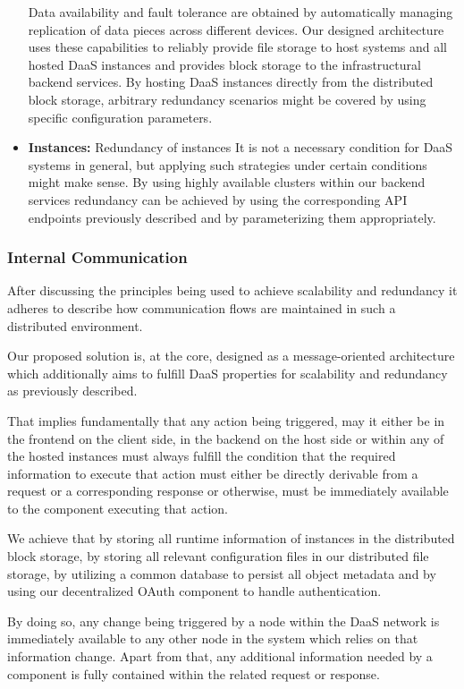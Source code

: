\documentclass[runningheads]{llncs}
\begin{document}
\begin{itemize}
Data availability and fault tolerance are obtained
by automatically managing replication
of data pieces across different devices.
Our designed architecture uses these capabilities
to reliably provide
file storage to host systems and all hosted DaaS instances
and provides block storage to the infrastructural backend services.
By hosting DaaS instances directly from the distributed block storage,
arbitrary redundancy scenarios might be covered
by using specific configuration parameters.
\item \textbf{Instances:} Redundancy of instances
It is not a necessary condition for DaaS systems in general, but applying such strategies under certain conditions might make sense.
By using highly available clusters within our backend services
redundancy can be achieved by using the corresponding API endpoints
previously described and by parameterizing them appropriately.
\end{itemize}

\subsubsection{Internal Communication}
After discussing the principles being used to achieve scalability and redundancy
it adheres to describe how communication flows are maintained
in such a distributed environment.

Our proposed solution is, at the core, designed
as a message-oriented architecture
which additionally aims to fulfill DaaS properties
for scalability and redundancy as previously described.

That implies fundamentally that any action being triggered,
may it either be in the frontend on the client side,
in the backend on the host side
or within any of the hosted instances
must always fulfill the condition that the required information to execute that action
must either be directly derivable from a request or a corresponding response
or otherwise, must be immediately available to the component executing that action.

We achieve that by storing all runtime information of instances in the distributed block storage,
by storing all relevant configuration files in our distributed file storage,
by utilizing a common database to persist all object metadata
and by using our decentralized OAuth component to handle authentication.

By doing so, any change being triggered by a node within the DaaS network
is immediately available to any other node in the system
which relies on that information change.
Apart from that, any additional information needed by a component
is fully contained within the related request or response.
\end{document}
